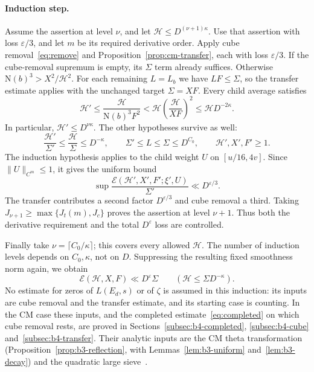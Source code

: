 \documentclass[11pt]{article}
\numberwithin{equation}{section}
\newcommand{\N}{\mathrm N}
\newcommand{\E}{\mathcal E}
\begin{document}
\paragraph{Induction step.}
Assume the assertion at level $\nu$, and let
$\mathcal H\le D^{(\nu+1)\kappa}$. Use that assertion with loss
$\varepsilon/3$, and let $m$ be its required derivative order.
Apply cube removal~\eqref{eq:remove} and
Proposition~\ref{prop:cm-transfer}, each with loss $\varepsilon/3$.
If the cube-removal supremum is empty, its $\Sigma$ term already
suffices. Otherwise $\N(b)^3>X^2/\mathcal H^2$.
For each remaining $L=L_b$ we have $LF\le\Sigma$, so the transfer
estimate applies with the unchanged target $\Sigma=XF$. Every child
average satisfies
\begin{equation}\label{eq:contract}
 \mathcal H'\le\frac{\mathcal H}{\N(b)^3F^2}
 <\mathcal H\left(\frac{\mathcal H}{XF}\right)^2
 \le\mathcal H D^{-2\kappa}.
\end{equation}
In particular, $\mathcal H'\le D^{\nu\kappa}$. The other hypotheses survive
as well:
\begin{equation}\label{eq:survive}
 \frac{\mathcal H'}{\Sigma'}\le\frac{\mathcal H}{\Sigma}
 \le D^{-\kappa},\qquad
 \Sigma'\le L\le\Sigma\le D^{C_0},\qquad
 \mathcal H',X',F'\ge1.
\end{equation}
The induction hypothesis applies to the child weight $U$ on
$[u/16,4v]$. Since $\|U\|_{C^m}\le1$, it gives the uniform bound
\begin{equation}\label{eq:childbound}
 \sup\frac{\E(\mathcal H',X',F';\xi',U)}{\Sigma'}
 \ll D^{\varepsilon/3}.
\end{equation}
The transfer contributes a second factor $D^{\varepsilon/3}$ and
cube removal a third. Taking $J_{\nu+1}\ge\max\{J_t(m),J_c\}$ proves the
assertion at level $\nu+1$. Thus both the derivative requirement and
the total $D^\varepsilon$ loss are controlled.

Finally take $\nu=\lceil C_0/\kappa\rceil$; this covers every allowed
$\mathcal H$. The number of induction levels depends on $C_0,\kappa$,
not on $D$. Suppressing the resulting fixed smoothness norm again,
we obtain
\begin{equation}\label{eq:finalenergy}
 \E(\mathcal H,X,F)\ll D^\varepsilon\Sigma
 \qquad(\mathcal H\le\Sigma D^{-\kappa}).
\end{equation}
No estimate for zeros of $L(E_d,s)$ or of $\zeta$ is assumed in this
induction: its inputs are cube removal and the transfer estimate, and
its starting case is counting. In the CM case these inputs, and the
completed estimate~\eqref{eq:completed} on which cube removal rests, are
proved in Sections~\ref{subsec:b4-completed}, \ref{subsec:b4-cube}
and~\ref{subsec:b4-transfer}. Their analytic inputs are the CM theta
transformation (Proposition~\ref{prop:b3-reflection}, with
Lemmas~\ref{lem:b3-uniform} and~\ref{lem:b3-decay}) and the quadratic large
sieve~\cite{GL}.
\end{document}

